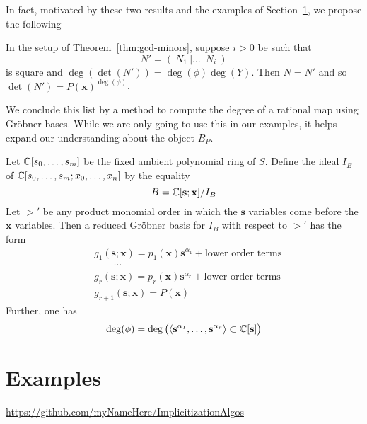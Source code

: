 \documentclass[fleqn,reqno]{amsart}
\begin{document}
\begin{paragraf*}
In fact, motivated by these two results and the examples of Section~\ref{sec:examples},
we propose the following
\end{paragraf*}

\begin{conjecture}
In the setup of Theorem~\ref{thm:gcd-minors}, suppose $i>0$ be such that
\[
	N'=(~N_1~|\ldots|~N_i~)
\]
is square and $\deg(\det(N'))=\deg(\phi)\deg(Y)$.
Then $N=N'$ and so $\det(N')=P(\mathbf x)^{\deg(\phi)}$.
\end{conjecture}

\begin{paragraf*}
We conclude this list by a method to compute the degree of a rational map using Gr\"{o}bner bases.
While we are only going to use this in our examples,
it helps expand our understanding about the object $B_P$.
\end{paragraf*}

\begin{proposition}
\label{prop:deg-GB}
Let $\mathbb{C}[s_0,\ldots,s_m]$ be the fixed ambient polynomial ring of $S$.
Define the ideal $I_B$ of $\mathbb{C}[s_0,\ldots,s_m;x_0,\ldots,x_n]$ by the equality
\[
	B=\mathbb{C}[\mathbf s;\mathbf x]/I_B
\]
Let $>'$ be any product monomial order in which the $\mathbf s$ variables
come before the $\mathbf x$ variables.
Then a reduced Gr\"obner basis for $I_B$ with respect to $>'$ has the form
\begin{align*}
	&g_1(\mathbf s;\mathbf x)=p_1(\mathbf x){\mathbf s}^{\alpha_1}+\text{lower order terms}\\
	&\qquad\cdots\\
	&g_r(\mathbf s;\mathbf x)=p_r(\mathbf x){\mathbf s}^{\alpha_r}+\text{lower order terms}\\
	&g_{r+1}(\mathbf s;\mathbf x)=P(\mathbf x)
\end{align*}
Further, one has
\[
	\deg(\phi)=
	\deg \big(\langle{\mathbf s}^{\alpha_1},\ldots,{\mathbf s}^{\alpha_r}\rangle\subset\mathbb{C}[\mathbf s]\big)
\]
\end{proposition}





\section{Examples}
\label{sec:examples}

\begin{paragraph*}

\begin{center}
\url{https://github.com/myNameHere/ImplicitizationAlgos}
\end{center}
\end{paragraph*}
\end{document}
